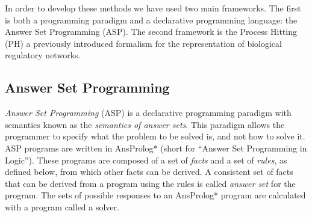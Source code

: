 In order to develop these methods we have used two main frameworks. The first is both a programming paradigm and a declarative programming language: the Answer Set Programming (ASP).
The second framework is the Process Hitting (PH) a previously introduced formalism for the representation of biological regulatory networks.

\subsection{Answer Set Programming }

\emph{Answer Set Programming} (ASP) is a declarative programming paradigm with semantics known as the \emph{semantics of answer sets}.
This paradigm allows the programmer to specify what the problem to be solved is, and not how to solve it.
ASP programs are written in AnsProlog* \cite{sureshkumar2006ansprolog} (short for “Answer Set Programming in Logic”).
These programs are composed of a set of \emph{facts} and a set of \emph{rules}, as defined below, from which other facts can be derived.
A consistent set of facts that can be derived from a program using the rules is called \emph{answer set} for the program.
The sets of possible responses to an AnsProlog* program are calculated with a program called a solver.

